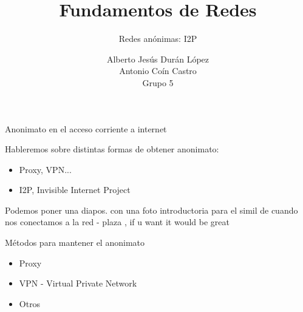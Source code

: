 \documentclass[spanish]{beamer}
\title{Fundamentos de Redes}
\subtitle{Redes anónimas: I2P}
\author{Alberto Jesús Durán López\\ Antonio Coín Castro\\ \vspace{1em}Grupo 5}
\begin{document}
\maketitle

\begin{frame}{Anonimato en el acceso corriente a internet}%

Hableremos sobre distintas formas de obtener anonimato: \\ %

\vspace{1.5em} %

\begin{itemize}
	\item Proxy, VPN...
    \item I2P, Invisible Internet Project \\ 
\end{itemize}

\vspace{1.5em} %


\end{frame}  





\begin{frame}
	Podemos poner una diapos. con una foto introductoria para el simil de cuando
	nos conectamos a la red - plaza , if u want it would be great
\end{frame}







\begin{frame}{Métodos para mantener el anonimato}
	
\begin{itemize}
	\item Proxy \\
	\item VPN - Virtual Private Network \\ 
	\item Otros
\end{itemize}	
	
	
\end{frame}
\end{document}
